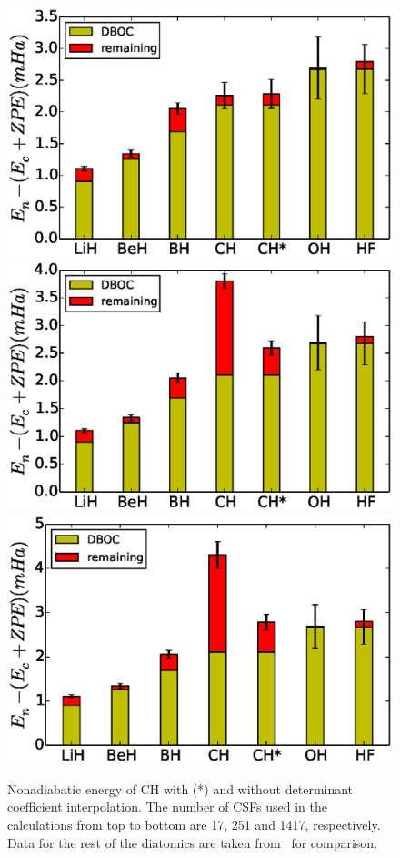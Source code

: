 \documentclass[aip,jcp,numerical,reprint]{revtex4-1}
\begin{document}
\begin{figure}[h]
\includegraphics[scale=0.5]{35}
\includegraphics[scale=0.5]{723}
\includegraphics[scale=0.5]{4738}
\caption{Nonadiabatic energy of CH with (*) and without determinant coefficient interpolation. The number of CSFs used in the calculations from top to bottom are 17, 251 and 1417, respectively. Data for the rest of the diatomics are taken from~\cite{Yang2015} for comparison.\label{fig:ch-interp} }
\end{figure}
\end{document}
